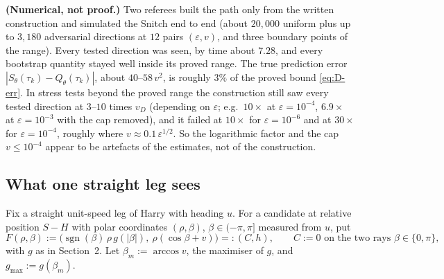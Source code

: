 \begin{remark}\label{rem:D1-slack}
\textbf{(Numerical, not proof.)} Two referees built the path only from the written construction and simulated the Snitch
end to end (about $20{,}000$ uniform plus up to $3{,}180$ adversarial directions at $12$ pairs $(\varepsilon,v)$, and three
boundary points of the range). Every tested direction was seen, by time about $7.28$, and every bootstrap quantity stayed well
inside its proved range. The true prediction error $|S_\theta(\tau_k)-Q_\theta(\tau_k)|$, about $40$--$58\,v^2$, is roughly $3\%$
of the proved bound \eqref{eq:D-err}. In stress tests beyond the proved range the construction still saw every tested direction
at $3$--$10$ times $v_D$ (depending on $\varepsilon$; e.g.\ $10\times$ at $\varepsilon=10^{-4}$, $6.9\times$ at
$\varepsilon=10^{-3}$ with the cap removed), and it failed at $10\times$ for $\varepsilon=10^{-6}$ and at $30\times$ for
$\varepsilon=10^{-4}$, roughly where $v\approx0.1\,\varepsilon^{1/2}$. So the logarithmic factor and the cap $v\le10^{-4}$
appear to be artefacts of the estimates, not of the construction.
\end{remark}

\subsection{What one straight leg sees}
Fix a straight unit-speed leg of Harry with heading $u$. For a candidate at relative position $S-H$ with polar coordinates
$(\rho,\beta)$, $\beta\in(-\pi,\pi]$ measured from $u$, put
\[
F(\rho,\beta):=\bigl(\operatorname{sgn}(\beta)\,\rho\,g(|\beta|),\ \rho(\cos\beta+v)\bigr)=:(C,h),\qquad C:=0\text{ on the two rays }\beta\in\{0,\pi\},
\]
with $g$ as in Section~2. Let $\beta_m:=\arccos v$, the maximiser of $g$, and $g_{\max}:=g(\beta_m)$.

